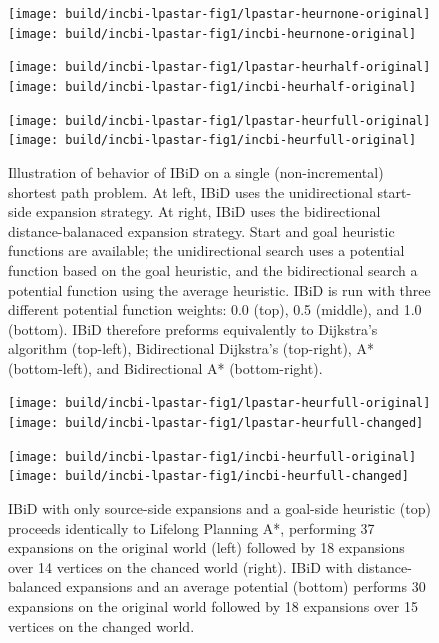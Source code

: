 \begin{figure}
   \centering%
   
   \texttt{[image: build/incbi-lpastar-fig1/lpastar-heurnone-original]}%
   \;\;%
   \texttt{[image: build/incbi-lpastar-fig1/incbi-heurnone-original]}%
   
   \vspace{0.2cm}
   
   \texttt{[image: build/incbi-lpastar-fig1/lpastar-heurhalf-original]}%
   \;\;%
   \texttt{[image: build/incbi-lpastar-fig1/incbi-heurhalf-original]}%
   
   \vspace{0.2cm}
   
   \texttt{[image: build/incbi-lpastar-fig1/lpastar-heurfull-original]}%
   \;\;%
   \texttt{[image: build/incbi-lpastar-fig1/incbi-heurfull-original]}%
   
   \caption{Illustration of behavior of IBiD on a single
      (non-incremental) shortest path problem.
      At left, IBiD uses the unidirectional start-side expansion
      strategy.
      At right, IBiD uses the bidirectional distance-balanaced
      expansion strategy.
      Start and goal heuristic functions are available;
      the unidirectional search uses a potential function based
      on the goal heuristic,
      and the bidirectional search a potential function using
      the average heuristic.
      IBiD is run with three different potential function weights:
      0.0 (top), 0.5 (middle), and 1.0 (bottom).
      IBiD therefore preforms equivalently to
      Dijkstra's algorithm (top-left),
      Bidirectional Dijkstra's (top-right),
      A* (bottom-left),
      and Bidirectional A* (bottom-right).}
   \label{fig:incbi-lpastar-fig1-heurchange}
\end{figure}

\begin{figure}
   \centering%
   
   \texttt{[image: build/incbi-lpastar-fig1/lpastar-heurfull-original]}%
   \;\;%
   \texttt{[image: build/incbi-lpastar-fig1/lpastar-heurfull-changed]}%
   
   \vspace{0.2cm}
   
   \texttt{[image: build/incbi-lpastar-fig1/incbi-heurfull-original]}%
   \;\;%
   \texttt{[image: build/incbi-lpastar-fig1/incbi-heurfull-changed]}%
   
   \caption{IBiD with only source-side expansions and a goal-side
      heuristic (top) proceeds identically to Lifelong Planning A*,
      performing 37 expansions on the original world (left)
      followed by 18 expansions over 14 vertices on the chanced
      world (right).
      IBiD with distance-balanced expansions and an average
      potential (bottom)
      performs 30 expansions on the original world
      followed by 18 expansions over 15 vertices on the changed
      world.}
   \label{fig:incbi-lpastar-fig1}
\end{figure}

